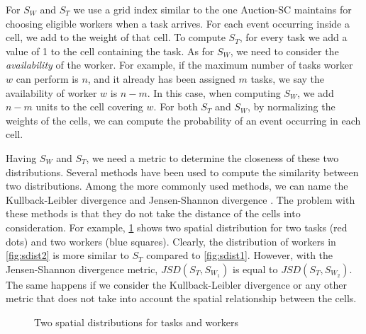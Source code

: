 For $S_W$ and $S_T$ we use a grid index similar to the one Auction-SC maintains for choosing eligible workers when a task arrives. For each event occurring inside a cell, we add to the weight of that cell. To compute $S_T$, for every task we add a value of 1 to the cell containing the task. As for $S_W$, we need to consider the \textit{availability} of the worker. For example, if the maximum number of tasks worker $w$ can perform is $n$, and it already has been assigned $m$ tasks, we say the availability of worker $w$ is $n-m$. In this case, when computing $S_W$, we add $n-m$ units to the cell covering $w$. For both $S_T$ and $S_W$, by normalizing the weights of the cells, we can compute the probability of an event occurring in each cell.

Having $S_W$ and $S_T$, we need a metric to determine the closeness of these two distributions. Several methods have been used to compute the similarity between two distributions. Among the more commonly used methods, we can name the Kullback-Leibler divergence \cite{Kullback51} and Jensen-Shannon divergence \cite{Lin91}. The problem with these methods is that they do not take the distance of the cells into consideration. For example, \cref{fig:sdist} shows two spatial distribution for two tasks (red dots) and two workers (blue squares). Clearly, the distribution of workers in \cref{fig:sdist2} is more similar to $S_T$ compared to \cref{fig:sdist1}. However, with the Jensen-Shannon divergence metric, $JSD(S_T, S_{W_1})$ is equal to $JSD(S_T, S_{W_2})$. The same happens if we consider the Kullback-Leibler divergence or any other metric that does not take into account the spatial relationship between the cells.

\begin{figure}[t]
    \centering
    \caption{Two spatial distributions for tasks and workers}
    \label{fig:sdist}
\end{figure}

